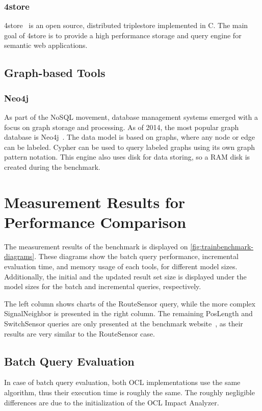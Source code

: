 \subsubsection{4store}
4store~\cite{harris20094store} is an open source, distributed triplestore implemented in C. The main goal of 4store is to provide a high performance storage and query engine for semantic web applications. 

\subsection{Graph-based Tools}

\subsubsection{Neo4j}
As part of the NoSQL movement, database management systems emerged with a focus on graph storage and processing. As of 2014, the most popular graph database is 
Neo4j~\cite{neo4j}. The data model is based on graphs, where any node or edge can be labeled. Cypher can be used to query labeled graphs using its own graph pattern notation. This engine also uses disk for data storing, so a RAM disk is created during the benchmark.

\section{Measurement Results for Performance Comparison}

\label{sec:results}

The measurement results of the benchmark is displayed on
\autoref{fig:trainbenchmark-diagrams}. These diagrams show the batch query
performance, incremental evaluation time, and memory usage of each tools, for
different model sizes. Additionally, the initial and the updated result set size
is displayed under the model sizes for the batch and incremental queries,
respectively.

The left column shows charts of the \textsf{RouteSensor} query,
while the more complex \textsf{SignalNeighbor} is presented in the right column.
The remaining \textsf{PosLength} and \textsf{SwitchSensor} queries are only presented
at the benchmark website~\cite{TBwebsite}, as their results are very similar to the
\textsf{RouteSensor} case.

\subsection{Batch Query Evaluation}
In case of batch query evaluation, both OCL implementations use the same
algorithm, thus their execution time is roughly the same. The roughly negligible
differences are due to the initialization of the OCL Impact Analyzer.

